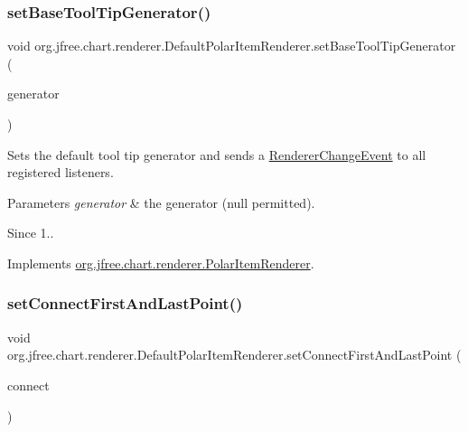 \subsubsection{\texorpdfstring{set\+Base\+Tool\+Tip\+Generator()}{setBaseToolTipGenerator()}}
{\footnotesize\ttfamily void org.\+jfree.\+chart.\+renderer.\+Default\+Polar\+Item\+Renderer.\+set\+Base\+Tool\+Tip\+Generator (\begin{DoxyParamCaption}\item[{\mbox{\hyperlink{interfaceorg_1_1jfree_1_1chart_1_1labels_1_1_x_y_tool_tip_generator}{X\+Y\+Tool\+Tip\+Generator}}}]{generator }\end{DoxyParamCaption})}

Sets the default tool tip generator and sends a \mbox{\hyperlink{}{Renderer\+Change\+Event}} to all registered listeners.


\begin{DoxyParams}{Parameters}
{\em generator} & the generator ({\ttfamily null} permitted).\\
\hline
\end{DoxyParams}
\begin{DoxySince}{Since}
1.. 
\end{DoxySince}


Implements \mbox{\hyperlink{interfaceorg_1_1jfree_1_1chart_1_1renderer_1_1_polar_item_renderer_a8228783ae5afbc99459106111e892a99}{org.\+jfree.\+chart.\+renderer.\+Polar\+Item\+Renderer}}.

\mbox{\label{classorg_1_1jfree_1_1chart_1_1renderer_1_1_default_polar_item_renderer_a595304e875979555b22236935f759ce2}} 
\subsubsection{\texorpdfstring{set\+Connect\+First\+And\+Last\+Point()}{setConnectFirstAndLastPoint()}}
{\footnotesize\ttfamily void org.\+jfree.\+chart.\+renderer.\+Default\+Polar\+Item\+Renderer.\+set\+Connect\+First\+And\+Last\+Point (\begin{DoxyParamCaption}\item[{boolean}]{connect }\end{DoxyParamCaption})}


